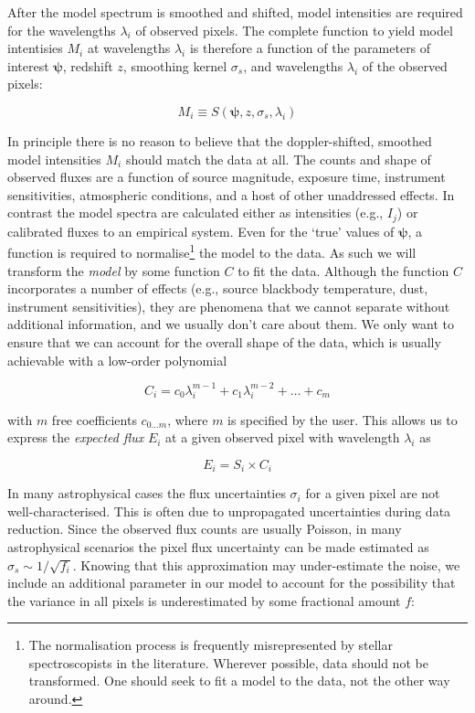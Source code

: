 \documentclass{aastex}
\begin{document}
After the model spectrum is smoothed and shifted, model intensities are required for the wavelengths $\lambda_i$ of observed pixels. The complete function to yield model intentisies $M_i$ at wavelengths $\lambda_i$ is therefore a function of the parameters of interest $\bm{\psi}$, redshift $z$, smoothing kernel $\sigma_{s}$, and wavelengths $\lambda_i$ of the observed pixels:

\begin{equation}
 M_{i} \equiv S\left(\bm{\psi},z,\sigma_{s},\lambda_i\right)
\end{equation}

In principle there is no reason to believe that the doppler-shifted, smoothed model intensities $M_i$ should match the data at all. The counts and shape of observed fluxes are a function of source magnitude, exposure time, instrument sensitivities, atmospheric conditions, and a host of other unaddressed effects. In contrast the model spectra are calculated either as intensities (e.g., $I_j$) or calibrated fluxes to an empirical system. Even for the `true' values of $\bm{\psi}$, a function is required to normalise\footnote{The normalisation process is frequently misrepresented by stellar spectroscopists in the literature. Wherever possible, data should not be transformed. One should seek to fit a model to the data, not the other way around.} the model to the data. As such we will transform the \textit{model} by some function $C$ to fit the data. Although the function $C$ incorporates a number of effects (e.g., source blackbody temperature, dust, instrument sensitivities), they are phenomena that we cannot separate without additional information, and we usually don't care about them. We only want to ensure that we can account for the overall shape of the data, which is usually achievable with a low-order polynomial

\begin{equation}
C_i = c_{0}\lambda_{i}^{m-1} + c_{1}\lambda_{i}^{m-2} + \dots + c_{m}
\end{equation}

\noindent{}with $m$ free coefficients $c_{0\dots{}m}$, where $m$ is specified by the user. This allows us to express the \textit{expected flux} $E_i$ at a given observed pixel with wavelength $\lambda_i$ as

\begin{equation}
E_i = S_{i}\times{}C_i
\end{equation}

In many astrophysical cases the flux uncertainties $\sigma_{i}$ for a given pixel are not well-characterised. This is often due to unpropagated uncertainties during data reduction. Since the observed flux counts are usually Poisson, in many astrophysical scenarios the pixel flux uncertainty can be made estimated as $\sigma_s \sim 1/\sqrt{f_{i}}$. Knowing that this approximation may under-estimate the noise, we include an additional parameter in our model to account for the possibility that the variance in all pixels is underestimated by some fractional amount $f$:
\end{document}
